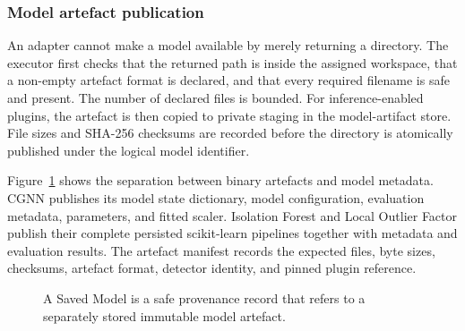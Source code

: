 \subsubsection{Model artefact publication}

An adapter cannot make a model available by merely returning a directory. The executor first checks that the returned path is inside the assigned workspace, that a non-empty artefact format is declared, and that every required filename is safe and present. The number of declared files is bounded. For inference-enabled plugins, the artefact is then copied to private staging in the model-artifact store. File sizes and SHA-256 checksums are recorded before the directory is atomically published under the logical model identifier.

Figure~\ref{fig:model_artifact_storage} shows the separation between binary artefacts and model metadata. CGNN publishes its model state dictionary, model configuration, evaluation metadata, parameters, and fitted scaler. Isolation Forest and Local Outlier Factor publish their complete persisted scikit-learn pipelines together with metadata and evaluation results. The artefact manifest records the expected files, byte sizes, checksums, artefact format, detector identity, and pinned plugin reference.

\begin{figure}[H]
    \centering
    \caption{A Saved Model is a safe provenance record that refers to a separately stored immutable model artefact.}
    \label{fig:model_artifact_storage}
\end{figure}

